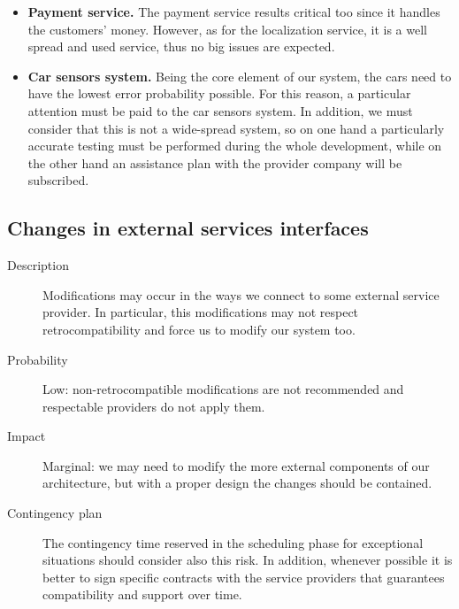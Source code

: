 \begin{description}
\begin{itemize}
				\item \textbf{Payment service.} The payment service results critical too since it handles the customers' money. However, as for the localization service, it is a well spread and used service, thus no big issues are expected.
				\item \textbf{Car sensors system.} Being the core element of our system, the cars need to have the lowest error probability possible. For this reason, a particular attention must be paid to the car sensors system. In addition, we must consider that this is not a wide-spread system, so on one hand a particularly accurate testing must be performed during the whole development, while on the other hand an assistance plan with the provider company will be subscribed.
			\end{itemize}
	\end{description}

\subsection*{Changes in external services interfaces}
	\begin{description}
		\item[Description] Modifications may occur in the ways we connect to some external service provider. In particular, this modifications may not respect retrocompatibility and force us to modify our system too.
		\item[Probability] Low: non-retrocompatible modifications are not recommended and respectable providers do not apply them.
		\item[Impact] Marginal: we may need to modify the more external components of our architecture, but with a proper design the changes should be contained.
		\item[Contingency plan] The contingency time reserved in the scheduling phase for exceptional situations should consider also this risk. In addition, whenever possible it is better to sign specific contracts with the service providers that guarantees compatibility and support over time.
	\end{description}

